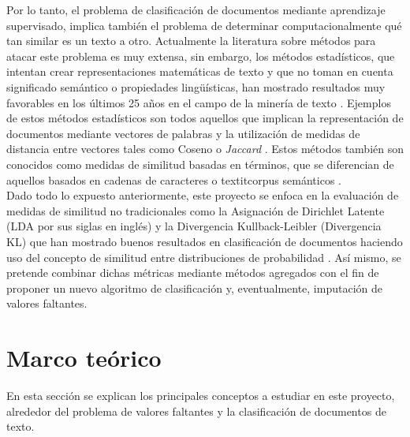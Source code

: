 Por lo tanto, el problema de clasificación de documentos mediante aprendizaje supervisado, implica también el problema de determinar computacionalmente qué tan similar es un texto a otro. Actualmente la literatura sobre métodos para atacar este problema es muy extensa, sin embargo, los métodos estadísticos, que intentan crear representaciones matemáticas de texto y que no toman en cuenta significado semántico o propiedades lingüísticas, han mostrado resultados muy favorables en los últimos 25 años en el campo de la minería de texto \cite{srivastava2009text}. Ejemplos de estos métodos estadísticos son todos aquellos que implican la representación de documentos mediante vectores de palabras y la utilización de medidas de distancia entre vectores tales como Coseno o \textit{Jaccard} \cite{wang2016non, soto2015similarity}. Estos métodos también son conocidos como medidas de similitud basadas en términos, que se diferencian de aquellos basados en cadenas de caracteres o textit{corpus} semánticos \cite{wang2016non}. \\
Dado todo lo expuesto anteriormente, este proyecto se enfoca en la evaluación de medidas de similitud no tradicionales como la Asignación de Dirichlet Latente (LDA por sus siglas en inglés) y la Divergencia Kullback-Leibler (Divergencia KL) que han mostrado buenos resultados en clasificación de documentos haciendo uso del concepto de similitud entre distribuciones de probabilidad \cite{ bae2014computing, bougiatiotis2016content, huang2008similarity, metzler2007similarity}. Así mismo, se pretende combinar dichas métricas mediante métodos agregados con el fin de proponer un nuevo algoritmo de clasificación y, eventualmente, imputación de valores faltantes.

\chapter{Marco teórico}
En esta sección se explican los principales conceptos a estudiar en este proyecto, alrededor del problema de valores faltantes y la clasificación de documentos de texto.
